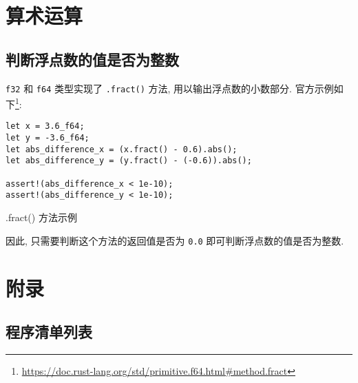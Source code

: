 \documentclass{crbook}
\begin{document}
\section{算术运算}
\subsection{判断浮点数的值是否为整数}

\texttt{f32} 和 \texttt{f64} 类型实现了 \texttt{.fract()} 方法, 用以输出浮点数的小数部分. 官方示例如下\footnote{\url{https://doc.rust-lang.org/std/primitive.f64.html\#method.fract}}:

\begin{listing}
    \linespread{1}
    \begin{verbatim}
let x = 3.6_f64;
let y = -3.6_f64;
let abs_difference_x = (x.fract() - 0.6).abs();
let abs_difference_y = (y.fract() - (-0.6)).abs();

assert!(abs_difference_x < 1e-10);
assert!(abs_difference_y < 1e-10);
    \end{verbatim}
    \caption{.fract() 方法示例}
\end{listing}

因此, 只需要判断这个方法的返回值是否为 \texttt{0.0} 即可判断浮点数的值是否为整数.

\newpage
\section{附录}
\subsection{程序清单列表}
\makeatletter
{}
\makeatother
\end{document}
